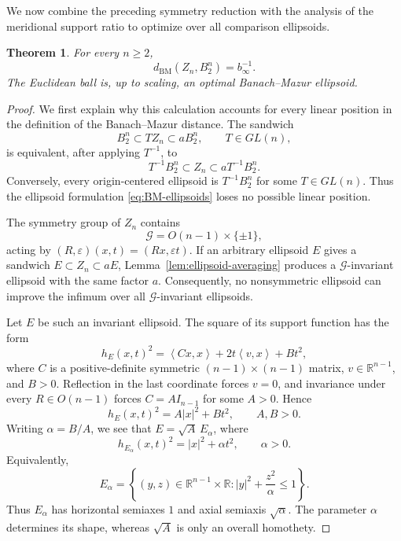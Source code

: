 \documentclass[11pt]{article}
\newtheorem{theorem}{Theorem}[section]
\theoremstyle{definition}
\theoremstyle{remark}
\newcommand{\R}{\mathbb R}
\newcommand{\abs}[1]{\left|#1\right|}
\newcommand{\ip}[2]{\left\langle #1,#2\right\rangle}
\newcommand{\BM}{\mathrm{BM}}
\begin{document}
We now combine the preceding symmetry reduction with the analysis of
the meridional support ratio to optimize over all comparison ellipsoids.



\begin{theorem}\label{thm:exact-BM}
For every $n\geq2$,
\begin{equation}\label{eq:exact-BM}
 d_{\BM}(Z_n,B_2^n)=b_\infty^{-1}.
\end{equation}
The Euclidean ball is, up to scaling, an optimal Banach--Mazur ellipsoid.
\end{theorem}

\begin{proof}
We first explain why this calculation accounts for every
linear position in the definition of the Banach--Mazur distance.  The
sandwich
\[
 B_2^n\subset TZ_n\subset aB_2^n,
 \qquad T\in GL(n),
\]
is equivalent, after applying $T^{-1}$, to
\[
 T^{-1}B_2^n\subset Z_n\subset aT^{-1}B_2^n.
\]
Conversely, every origin-centered ellipsoid is $T^{-1}B_2^n$ for some
$T\in GL(n)$.  Thus the ellipsoid formulation
\eqref{eq:BM-ellipsoids} loses no possible linear position.

The symmetry group of $Z_n$ contains
\[
 \mathcal G=O(n-1)\times\{\pm1\},
\]
acting by $(R,\varepsilon)(x,t)=(Rx,\varepsilon t)$.  If an arbitrary
ellipsoid $E$ gives a sandwich
$E\subset Z_n\subset aE$, Lemma~\ref{lem:ellipsoid-averaging}
produces a $\mathcal G$-invariant ellipsoid with the same factor $a$.
Consequently, no nonsymmetric ellipsoid can improve the infimum over
all $\mathcal G$-invariant ellipsoids.

Let $E$ be such an invariant ellipsoid.  The square of its support
function has the form
\[
 h_E(x,t)^2
 =\ip{Cx}{x}+2t\ip{v}{x}+Bt^2,
\]
where $C$ is a positive-definite symmetric $(n-1)\times(n-1)$ matrix,
$v\in\R^{n-1}$, and $B>0$.  Reflection in the last coordinate forces
$v=0$, and invariance under every $R\in O(n-1)$ forces
$C=AI_{n-1}$ for some $A>0$.  Hence
\[
 h_E(x,t)^2=A\abs{x}^2+Bt^2,
 \qquad A,B>0.
\]
Writing $\alpha=B/A$, we see that $E=\sqrt A\,E_\alpha$, where
\begin{equation}\label{eq:Ealpha}
 h_{E_\alpha}(x,t)^2=\abs{x}^2+\alpha t^2,
 \qquad \alpha>0.
\end{equation}
Equivalently,
\[
 E_\alpha
 =\left\{(y,z)\in\R^{n-1}\times\R:
          \abs{y}^2+\frac{z^2}{\alpha}\leq1\right\}.
\]
Thus $E_\alpha$ has horizontal semiaxes $1$ and axial semiaxis
$\sqrt\alpha$.  The parameter $\alpha$ determines its shape, whereas
$\sqrt A$ is only an overall homothety.


\end{proof}
\end{document}
